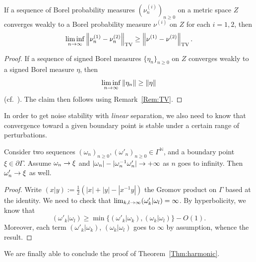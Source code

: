 \documentclass[AHL,Unicode,longabstracts,published]{cedram}
\DeclareMathOperator{\TV}{TV}
\newcommand{\N}{\mathbb{N}}
\renewcommand{\(}{\left(}
\renewcommand{\)}{\right)}
\renewcommand*{\to}{\mathchoice{\longrightarrow}{\rightarrow}{\rightarrow}{\rightarrow}}
\begin{document}
\begin{lemm}\label{Lem:weak}
If a sequence of Borel probability measures $(\nu_n^{(i)})_{n\geq 0}$ on a metric space $Z$ converges weakly to a Borel probability measure $\nu^{(i)}$ on $Z$ for each $i=1, 2$, then
\[
\liminf_{n \to \infty}\left\|\nu_n^{(1)}-\nu_n^{(2)}\right\|_{\TV} \ge \left\|\nu^{(1)}-\nu^{(2)}\right\|_{\TV}.
\]
\end{lemm}


\begin{proof}
If a sequence of signed Borel measures $\{\eta_n\}_{n \geq 0}$ on $Z$ converges weakly to a signed Borel measure $\eta$, then
\[
\liminf_{n \to \infty}\|\eta_n\| \ge \|\eta\|
\]
(cf.~\cite[Theorem~4.8.1]{BogachevWeak}). The claim then follows using Remark~\ref{Rem:TV}.
\end{proof}


In order to get noise stability with \emph{linear} separation, we also need to know that convergence toward a given boundary point is stable under a certain range of perturbations.

\begin{lemm}\label{conv-perturb}
Consider two sequences $(\omega_{n})_{n\geq 0}, (\omega'_{n})_{n\geq 0}\in \Gamma^\N$, and a boundary point $\xi \in\partial \Gamma$. Assume $\omega_{n}\to \xi $ and $|\omega_{n}|-|\omega^{-1}_{n}\omega'_{n}|\to + \infty$ as $n$ goes to infinity. Then $\omega'_{n}\to \xi$ as well.
\end{lemm}

\begin{proof}
Write $(x | y):=\frac{1}{2}\left(|x|+|y|-|x^{-1}y| \right)$ the Gromov product on $\Gamma$ based at the identity.
We need to check that $\lim_{k,l\to \infty}(\omega'_{k}| \omega_{l})=\infty$. By hyperbolicity, we know that
\[
(\omega'_{k} | \omega_{l}) \geq \min\{(\omega'_{k} | \omega_{k}), (\omega_{k} | \omega_{l})\} - O(1).
\]
Moreover, each term $(\omega'_{k} | \omega_{k})$, $(\omega_{k} | \omega_{l})$ goes to $\infty$ by assumption, whence the result.
\end{proof}

We are finally able to conclude the proof of Theorem~\ref{Thm:harmonic}.
\end{document}
